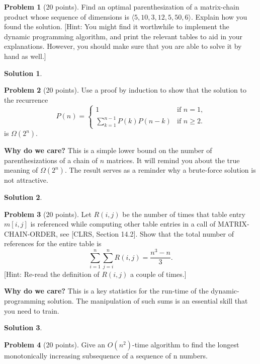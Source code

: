 \documentclass{article}
\theoremstyle{definition}
\newtheorem{problem}{Problem}
\newtheorem*{solution}{Solution}
\begin{document}
\begin{problem}[20 points]
  Find an optimal parenthesization of a matrix-chain product whose
  sequence of dimensions is $\langle 5, 10, 3, 12, 5, 50, 6\rangle$. 
  Explain how you found the solution. [Hint: You might find it
  worthwhile to implement the dynamic programming algorithm, and print
  the relevant tables to aid in your explanations. However, you should
  make sure that you are able to solve it by hand as well.] 
\end{problem}
\begin{solution}
\end{solution}

\begin{problem}[20 points]
  Use a proof by induction to show that the solution to the
  recurrence
  $$ P(n) = 
  \begin{cases}
    1& \text{if $n=1$,} \\
    \sum_{k=1}^{n-1} P(k)P(n-k) & \text{if $n\ge 2$.}
  \end{cases}
  $$
    is $\Omega(2^n)$. 
  \end{problem}

{\small \textbf{Why do we care?} This is a simple lower bound on the
  number of parenthesizations of a chain of $n$ matrices. It will
  remind you about the true meaning of $\Omega(2^n)$. The result serves as a
  reminder why a brute-force solution is not attractive.} 
  
\begin{solution}
\end{solution}

\begin{problem}[20 points]
Let $R(i,j)$ be the number of times that table entry $m[i,j]$ is
referenced while computing other table entries in a call of
MATRIX-CHAIN-ORDER, see [CLRS, Section 14.2].  Show that the total number of references for the
entire table is
$$ \sum_{i=1}^n\sum_{j=i}^n R(i,j) = \frac{n^3-n}{3}.$$
[Hint: Re-read the definition of $R(i,j)$ a couple of times.] 
\end{problem}

{\small \textbf{Why do we care?} This is a key statistics for the
  run-time of the dynamic-programming solution. The manipulation of such sums
  is an essential skill that you need to train.} 

\begin{solution}
\end{solution}

\begin{problem}[20 points]
  Give an $O(n^2)$-time algorithm to find the longest monotonically
  increasing subsequence of a sequence of n numbers.
\end{problem}
\end{document}
